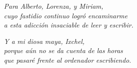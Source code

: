 \newpage %
\thispagestyle{empty} %

\vspace*{0.5in} %
\begin{flushright} %
\textit{ %
	Para Alberto, Lorenza, y Miriam,\\
	cuyo fastidio continuo logró encaminarme\\
	a esta adicción insaciable de leer y escribir.\\
}

\vspace{0.5in} %
\textit{ %
	Y a mi diosa maya, Ixchel,\\
	porque aún no se da cuenta de las horas\\
	que pasaré frente al ordenador escribiendo.\\
}
\end{flushright} %

\cleardoublepage %